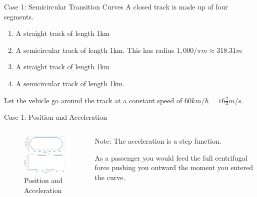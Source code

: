 \documentclass{beamer}
\begin{document}
\begin{frame}{Case 1: Semicircular Transition Curves}
	A closed  track is made up of four segments.
	\begin{enumerate}
		\item A straight track of length 1km
		\item A semicircular track of length 1km. This has radius $1,000 / \pi m \approx 318.31m$
		\item A straight track of length 1km
		\item A semicircular track of length 1km.
	\end{enumerate}
	Let the vehicle go around the track at a constant speed of $60 km/h = 16 \frac{2}{3} m/s$.
\end{frame}

\begin{frame}{Case 1: Position and Acceleration}
	\begin{columns}
		\begin{column}{0.8\textwidth}			
			\begin{figure}
				\caption{Position and Acceleration}
				\centering
				\includegraphics[width=70mm, scale=0.2]{circular_track.png}
			\end{figure}
		\end{column}
		\begin{column}{0.33\textwidth}
			Note: The acceleration is a step function. 
			
			
			As a passenger you would feed the full centrifugal force pushing you outward the moment you entered the curve. 		
		\end{column}
	\end{columns}
\end{frame}
\end{document}
